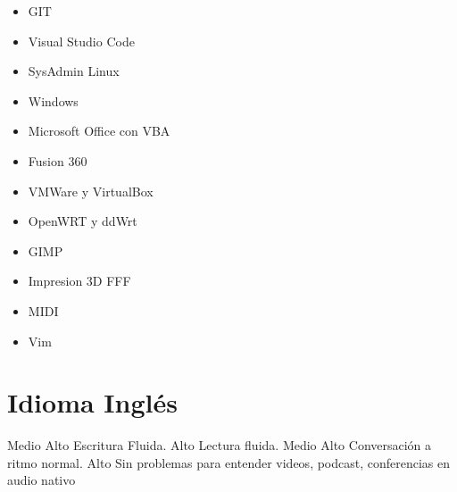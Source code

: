 \documentclass[draft,color,12pt,letterpaper,sans]{moderncv}
\begin{document}
{
	\begin{itemize}
		\item
			GIT
		\item
			Visual Studio Code
		\item
			SysAdmin Linux
		\item
			Windows
		\item
			Microsoft Office con VBA
		\item
			Fusion 360
		\item
			VMWare y VirtualBox
		\item
			OpenWRT y ddWrt
		\item
			GIMP
		\item
			Impresion 3D FFF
		\item
			MIDI
		\item	
			Vim
	\end{itemize}
}



\newpage

\section{Idioma Ingl\'es}
{Medio Alto}
{Escritura Fluida.}
{Alto}
{Lectura fluida.}
{Medio Alto}
{Conversaci\'on a ritmo normal.}
{Alto}
{Sin problemas para entender videos, podcast, conferencias en audio nativo}
\end{document}
